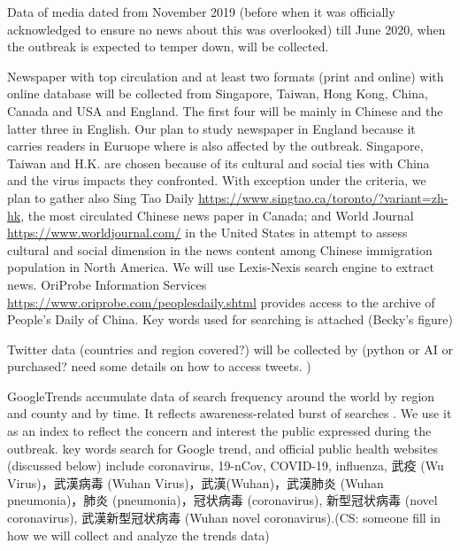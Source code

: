 


Data of media dated from November 2019 (before when it was officially acknowledged to ensure no news about this was overlooked) till June 2020, when the outbreak is expected to temper down, will be collected.  


Newspaper with top circulation and at least two formats (print and online) with online database will be collected from Singapore, Taiwan, Hong Kong, China, Canada and USA and England. The first four will be mainly in Chinese and the latter three in English.  Our plan to study newspaper in England because it carries readers in Euruope where is also affected by the outbreak.  Singapore, Taiwan and H.K. are chosen because of its cultural and social ties with China and the virus impacts they confronted.  With exception under the criteria, we plan to gather also Sing Tao Daily \url{https://www.singtao.ca/toronto/?variant=zh-hk}, the most circulated Chinese news paper in Canada; and World Journal \url{https://www.worldjournal.com/} in the United States in attempt to assess cultural and social dimension in the news content among Chinese immigration population in North America.  We will use Lexis-Nexis search engine to extract news.  OriProbe Information Services \url{https://www.oriprobe.com/peoplesdaily.shtml} provides access to the archive of People’s Daily of China.  Key words used for searching is attached (Becky’s figure) 

Twitter data (countries and region covered?) will be collected by (python or AI or purchased? need some details on how to access tweets. ) 

\begin{CJK*}{UTF8}{gbsn}
GoogleTrends accumulate data of search frequency around the world by region and county and by time.  It reflects awareness-related burst of searches \cite{BousAgac17, MahrBrag19}.  We use it as an index to reflect the concern and interest the public expressed during the outbreak.  key words search for Google trend, and official public health websites (discussed below) include coronavirus, 19-nCov, COVID-19, influenza, 武疫 (Wu Virus)，武漢病毒 (Wuhan Virus)，武漢(Wuhan)，武漢肺炎 (Wuhan pneumonia)，肺炎 (pneumonia)，冠状病毒 (coronavirus), 新型冠状病毒 (novel coronavirus), 武漢新型冠状病毒 (Wuhan novel coronavirus).(CS:  someone fill in how we will collect and analyze the trends data)
\end{CJK*}

